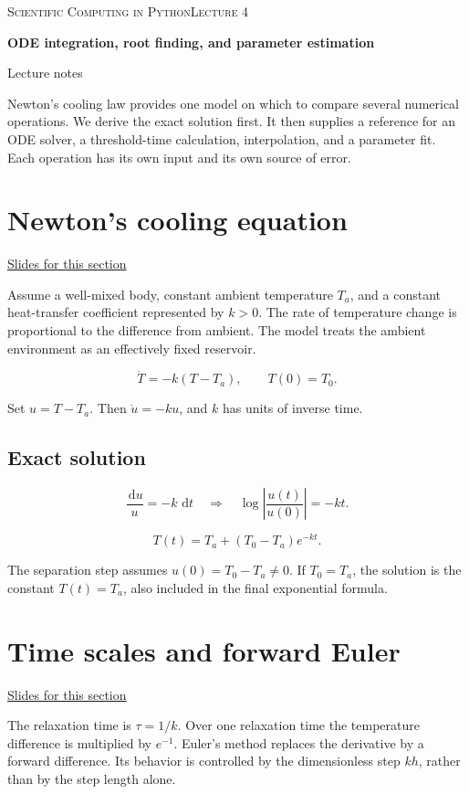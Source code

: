 \documentclass[11pt,letterpaper]{article}
\providecommand{\dd}{\,\mathrm{d}}\providecommand{\R}{\mathbb{R}}
\theoremstyle{definition}\newtheorem{definition}{Definition}\newtheorem{example}{Example}
\numberwithin{equation}{section}
\begin{document}
{\small\scshape Scientific Computing in Python\hfill Lecture 4}\par\medskip
{\raggedright{}\LARGE\bfseries\color{ink} ODE integration, root finding, and parameter estimation\par}\medskip
{\small Lecture notes}\par\bigskip
Newton's cooling law provides one model on which to compare several numerical operations. We derive the exact solution first. It then supplies a reference for an ODE solver, a threshold-time calculation, interpolation, and a parameter fit. Each operation has its own input and its own source of error.

\section{Newton's cooling equation}
\hypertarget{note-newton-s-cooling-equation}{}\label{note:newton-s-cooling-equation}
{\small \href{slides.html\#frame=newton-s-cooling-equation\&step=1}{Slides for this section}}\par
Assume a well-mixed body, constant ambient temperature $T_a$, and a constant heat-transfer coefficient represented by $k>0$. The rate of temperature change is proportional to the difference from ambient. The model treats the ambient environment as an effectively fixed reservoir.

\[
\dot T=-k(T-T_a),\qquad T(0)=T_0.
\]

Set $u=T-T_a$. Then $\dot u=-ku$, and $k$ has units of inverse time.

\subsection*{Exact solution}
\[
\frac{\dd u}{u}=-k\,\dd t
\quad\Longrightarrow\quad
\log\left|\frac{u(t)}{u(0)}\right|=-kt.
\]

\[
T(t)=T_a+(T_0-T_a)e^{-kt}.
\]

The separation step assumes $u(0)=T_0-T_a\ne0$. If $T_0=T_a$, the solution is the constant $T(t)=T_a$, also included in the final exponential formula.
\section{Time scales and forward Euler}
\hypertarget{note-time-scales-and-forward-euler}{}\label{note:time-scales-and-forward-euler}
{\small \href{slides.html\#frame=time-scales-and-forward-euler\&step=1}{Slides for this section}}\par
The relaxation time is $\tau=1/k$. Over one relaxation time the temperature difference is multiplied by $e^{-1}$. Euler's method replaces the derivative by a forward difference. Its behavior is controlled by the dimensionless step $kh$, rather than by the step length alone.
\end{document}
